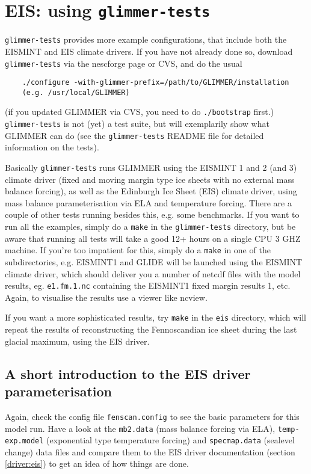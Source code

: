 
\section{EIS: using \texttt{glimmer-tests}}
\texttt{glimmer-tests} provides more example configurations, that include both the EISMINT
and EIS climate drivers. If you have not already done so, download
\texttt{glimmer-tests} via the nescforge page or CVS, and do the usual
\begin{verbatim}
    ./configure -with-glimmer-prefix=/path/to/GLIMMER/installation
    (e.g. /usr/local/GLIMMER)
\end{verbatim}
(if you updated GLIMMER via CVS, you need to do \texttt{./bootstrap} first.)\\
\texttt{glimmer-tests} is not (yet) a test suite, but will exemplarily show
what GLIMMER can do (see the \texttt{glimmer-tests} README file for detailed
information on the tests).

Basically \texttt{glimmer-tests} runs GLIMMER using the EISMINT 1 and 2 (and 3)
climate driver (fixed and moving margin type ice sheets with no external mass
balance forcing), as well as the Edinburgh Ice Sheet (EIS) climate driver,
using mass balance parameterisation via ELA and temperature forcing. There are
a couple of other tests running besides this, e.g. some benchmarks. If you want
to run all the examples, simply do a \texttt{make} in the
\texttt{glimmer-tests} directory, but be aware that running all tests will take a good
12+ hours on a single CPU 3 GHZ machine. If you're too impatient for this,
simply do a \texttt{make} in one of the subdirectories, e.g. EISMINT1 and GLIDE
will be launched using the EISMINT climate driver, which should deliver you a
number of netcdf files with the model results, eg. \texttt{e1.fm.1.nc}
containing the EISMINT1 fixed margin results 1, etc. Again, to visualise the
results use a viewer like ncview.

If you want a more sophisticated results, try \texttt{make} in the \texttt{eis}
directory, which will repeat the results of \cite{Hagdorn2003} reconstructing
the Fennoscandian ice sheet during the last glacial maximum, using the EIS
driver.

\subsection{A short introduction to the EIS driver parameterisation}

Again, check the config file \texttt{fenscan.config} to see the basic
parameters for this model run. Have a look at the \texttt{mb2.data} (mass
balance forcing via ELA), \texttt{temp-exp.model} (exponential type temperature
forcing) and \texttt{specmap.data} (sealevel change) data files and compare
them to the EIS driver documentation (section \ref{driver:eis}) to get an idea of how things are done.

